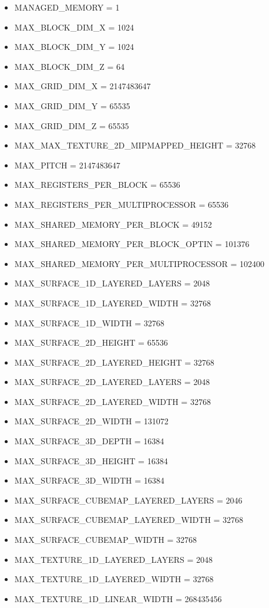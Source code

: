 \documentclass{article}
\begin{document}
\begin{itemize}
    \item MANAGED\_MEMORY = 1
    \item MAX\_BLOCK\_DIM\_X = 1024
    \item MAX\_BLOCK\_DIM\_Y = 1024
    \item MAX\_BLOCK\_DIM\_Z = 64
    \item MAX\_GRID\_DIM\_X = 2147483647
    \item MAX\_GRID\_DIM\_Y = 65535
    \item MAX\_GRID\_DIM\_Z = 65535
    \item MAX\_MAX\_TEXTURE\_2D\_MIPMAPPED\_HEIGHT = 32768
    \item MAX\_PITCH = 2147483647
    \item MAX\_REGISTERS\_PER\_BLOCK = 65536
    \item MAX\_REGISTERS\_PER\_MULTIPROCESSOR = 65536
    \item MAX\_SHARED\_MEMORY\_PER\_BLOCK = 49152
    \item MAX\_SHARED\_MEMORY\_PER\_BLOCK\_OPTIN = 101376
    \item MAX\_SHARED\_MEMORY\_PER\_MULTIPROCESSOR = 102400
    \item MAX\_SURFACE\_1D\_LAYERED\_LAYERS = 2048
    \item MAX\_SURFACE\_1D\_LAYERED\_WIDTH = 32768
    \item MAX\_SURFACE\_1D\_WIDTH = 32768
    \item MAX\_SURFACE\_2D\_HEIGHT = 65536
    \item MAX\_SURFACE\_2D\_LAYERED\_HEIGHT = 32768
    \item MAX\_SURFACE\_2D\_LAYERED\_LAYERS = 2048
    \item MAX\_SURFACE\_2D\_LAYERED\_WIDTH = 32768
    \item MAX\_SURFACE\_2D\_WIDTH = 131072
    \item MAX\_SURFACE\_3D\_DEPTH = 16384
    \item MAX\_SURFACE\_3D\_HEIGHT = 16384
    \item MAX\_SURFACE\_3D\_WIDTH = 16384
    \item MAX\_SURFACE\_CUBEMAP\_LAYERED\_LAYERS = 2046
    \item MAX\_SURFACE\_CUBEMAP\_LAYERED\_WIDTH = 32768
    \item MAX\_SURFACE\_CUBEMAP\_WIDTH = 32768
    \item MAX\_TEXTURE\_1D\_LAYERED\_LAYERS = 2048
    \item MAX\_TEXTURE\_1D\_LAYERED\_WIDTH = 32768
    \item MAX\_TEXTURE\_1D\_LINEAR\_WIDTH = 268435456

\end{itemize}
\end{document}
